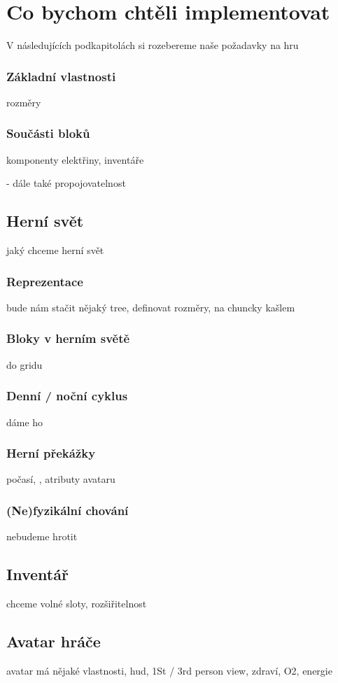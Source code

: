 


\section{Co bychom chtěli implementovat}

V následujících podkapitolách si rozebereme naše požadavky na hru





\subsubsection{Základní vlastnosti}
rozměry

\subsubsection{Součásti bloků}
komponenty elektřiny, inventáře

- dále také propojovatelnost


\subsection{Herní svět}

jaký chceme herní svět

\subsubsection{Reprezentace}

bude nám stačit nějaký tree, definovat rozměry, na chuncky kašlem

\subsubsection{Bloky v herním světě}

do gridu

\subsubsection{Denní / noční cyklus}
dáme ho

\subsubsection{Herní překážky}

počasí, , atributy avataru

\subsubsection{(Ne)fyzikální chování}

nebudeme hrotit

\subsection{Inventář}

chceme volné sloty, rozšiřitelnost

\subsection{Avatar hráče}
avatar má nějaké vlastnosti, \gls{hud}, 1St / 3rd person view, zdraví,  O2, energie



